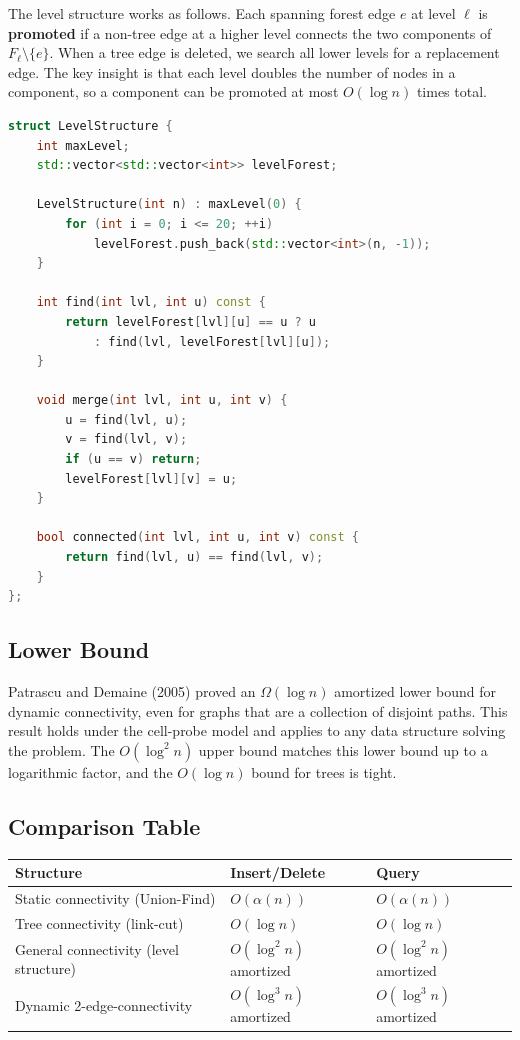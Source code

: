 The level structure works as follows. Each spanning forest edge $e$ at level $\ell$ is \textbf{promoted} if a non-tree edge at a higher level connects the two components of $F_\ell \setminus \{e\}$. When a tree edge is deleted, we search all lower levels for a replacement edge. The key insight is that each level doubles the number of nodes in a component, so a component can be promoted at most $O(\log n)$ times total.

\begin{lstlisting}[language=C++]
struct LevelStructure {
    int maxLevel;
    std::vector<std::vector<int>> levelForest;

    LevelStructure(int n) : maxLevel(0) {
        for (int i = 0; i <= 20; ++i)
            levelForest.push_back(std::vector<int>(n, -1));
    }

    int find(int lvl, int u) const {
        return levelForest[lvl][u] == u ? u
            : find(lvl, levelForest[lvl][u]);
    }

    void merge(int lvl, int u, int v) {
        u = find(lvl, u);
        v = find(lvl, v);
        if (u == v) return;
        levelForest[lvl][v] = u;
    }

    bool connected(int lvl, int u, int v) const {
        return find(lvl, u) == find(lvl, v);
    }
};
\end{lstlisting}

\subsection{Lower Bound}

Patrascu and Demaine (2005) proved an $\Omega(\log n)$ amortized lower bound for dynamic connectivity, even for graphs that are a collection of disjoint paths. This result holds under the cell-probe model and applies to any data structure solving the problem. The $O(\log^2 n)$ upper bound matches this lower bound up to a logarithmic factor, and the $O(\log n)$ bound for trees is tight.

\subsection{Comparison Table}

\begin{center}
\begin{tabular}{lll}
\toprule
Structure & Insert/Delete & Query \\
\midrule
Static connectivity (Union-Find) & $O(\alpha(n))$ & $O(\alpha(n))$ \\
Tree connectivity (link-cut) & $O(\log n)$ & $O(\log n)$ \\
General connectivity (level structure) & $O(\log^2 n)$ amortized & $O(\log^2 n)$ amortized \\
Dynamic 2-edge-connectivity & $O(\log^3 n)$ amortized & $O(\log^3 n)$ amortized \\
\bottomrule
\end{tabular}
\end{center}

